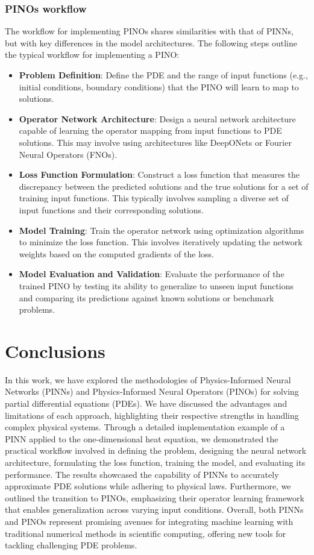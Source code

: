 \documentclass[final,1p,times]{elsarticle}
\theoremstyle{definition}
\begin{document}
\subsubsection{PINOs workflow}

The workflow for implementing PINOs shares similarities with that of PINNs, but with key differences in the model architectures. The following steps outline the typical workflow for implementing a PINO:

\begin{itemize}
  \item \textbf{Problem Definition}: Define the PDE and the range of input functions (e.g., initial conditions, boundary conditions) that the PINO will learn to map to solutions.
  \item \textbf{Operator Network Architecture}: Design a neural network architecture capable of learning the operator mapping from input functions to PDE solutions. This may involve using architectures like DeepONets or Fourier Neural Operators (FNOs).
  \item \textbf{Loss Function Formulation}: Construct a loss function that measures the discrepancy between the predicted solutions and the true solutions for a set of training input functions. This typically involves sampling a diverse set of input functions and their corresponding solutions.
  \item \textbf{Model Training}: Train the operator network using optimization algorithms to minimize the loss function. This involves iteratively updating the network weights based on the computed gradients of the loss.
  \item \textbf{Model Evaluation and Validation}: Evaluate the performance of the trained PINO by testing its ability to generalize to unseen input functions and comparing its predictions against known solutions or benchmark problems.
\end{itemize}

\section{Conclusions}

In this work, we have explored the methodologies of Physics-Informed Neural Networks (PINNs) and Physics-Informed Neural Operators (PINOs) for solving partial differential equations (PDEs). We have discussed the advantages and limitations of each approach, highlighting their respective strengths in handling complex physical systems. Through a detailed implementation example of a PINN applied to the one-dimensional heat equation, we demonstrated the practical workflow involved in defining the problem, designing the neural network architecture, formulating the loss function, training the model, and evaluating its performance. The results showcased the capability of PINNs to accurately approximate PDE solutions while adhering to physical laws. Furthermore, we outlined the transition to PINOs, emphasizing their operator learning framework that enables generalization across varying input conditions. Overall, both PINNs and PINOs represent promising avenues for integrating machine learning with traditional numerical methods in scientific computing, offering new tools for tackling challenging PDE problems.
\end{document}
